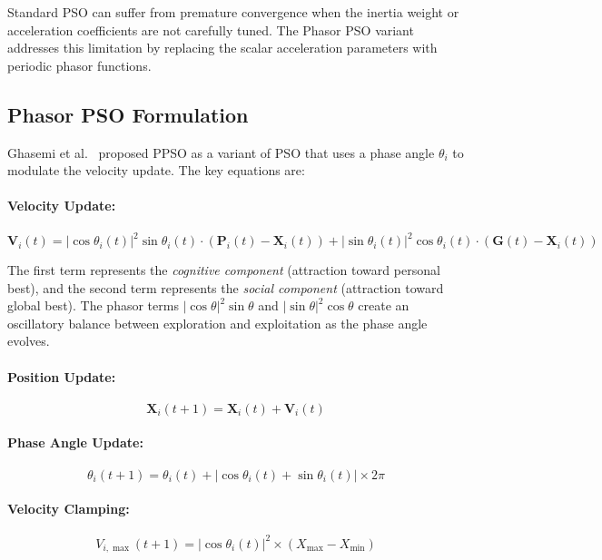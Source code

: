 Standard PSO can suffer from premature convergence when the inertia weight or acceleration coefficients are not carefully tuned. The Phasor PSO variant addresses this limitation by replacing the scalar acceleration parameters with periodic phasor functions.

\subsection{Phasor PSO Formulation}

Ghasemi et al.\ \parencite{ghasemi2019ppso} proposed PPSO as a variant of PSO that uses a phase angle $\theta_i$ to modulate the velocity update. The key equations are:

\paragraph{Velocity Update:}
\begin{equation}\label{eq:ppso_vel}
    \mathbf{V}_i(t) = |\cos \theta_i(t)|^2 \sin \theta_i(t) \cdot (\mathbf{P}_i(t) - \mathbf{X}_i(t)) + |\sin \theta_i(t)|^2 \cos \theta_i(t) \cdot (\mathbf{G}(t) - \mathbf{X}_i(t))
\end{equation}

The first term represents the \emph{cognitive component} (attraction toward personal best), and the second term represents the \emph{social component} (attraction toward global best). The phasor terms $|\cos\theta|^2 \sin\theta$ and $|\sin\theta|^2 \cos\theta$ create an oscillatory balance between exploration and exploitation as the phase angle evolves.

\paragraph{Position Update:}
\begin{equation}\label{eq:ppso_pos}
    \mathbf{X}_i(t+1) = \mathbf{X}_i(t) + \mathbf{V}_i(t)
\end{equation}

\paragraph{Phase Angle Update:}
\begin{equation}\label{eq:ppso_theta}
    \theta_i(t+1) = \theta_i(t) + |\cos \theta_i(t) + \sin \theta_i(t)| \times 2\pi
\end{equation}

\paragraph{Velocity Clamping:}
\begin{equation}\label{eq:ppso_vmax}
    V_{i,\max}(t+1) = |\cos \theta_i(t)|^2 \times (X_{\max} - X_{\min})
\end{equation}

